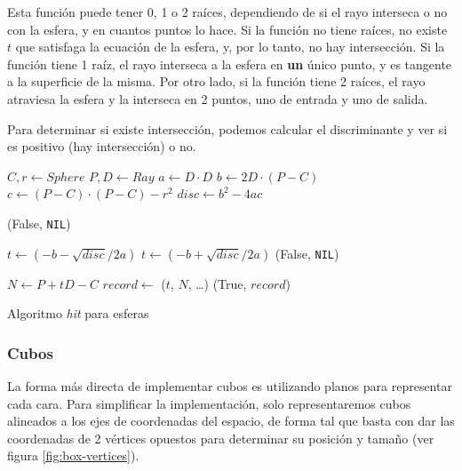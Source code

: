 Esta función puede tener 0, 1 o 2 raíces, dependiendo de si el rayo interseca o
no con la esfera, y en cuantos puntos lo hace. Si la función no tiene raíces, no
existe $t$ que satisfaga la ecuación de la esfera, y, por lo tanto, no hay
intersección. Si la función tiene 1 raíz, el rayo interseca a la esfera en
\textbf{un} único punto, y es tangente a la superficie de la misma. Por otro
lado, si la función tiene 2 raíces, el rayo atraviesa la esfera y la interseca
en 2 puntos, uno de entrada y uno de salida.

Para determinar si existe intersección, podemos calcular el discriminante y ver
si es positivo (hay intersección) o no.

\begin{algorithm}
  \begin{algorithmic}[1]
    \State $C, r \gets Sphere$ 
    \State $P, D \gets Ray$ 
    \State $a \gets D \cdot D$
    \State $b \gets 2D \cdot (P - C)$
    \State $c \gets (P - C) \cdot (P - C) - r^2$
    \State $disc \gets b^2 - 4ac$

    \State \Return (False, \texttt{NIL})
    \EndIf

    \State $t \gets (-b - \sqrt{disc} / 2a)$
    \State $t \gets (-b + \sqrt{disc} / 2a)$
    \State \Return (False, \texttt{NIL})
    \EndIf
    \EndIf

    \State $N \gets P + tD - C$ 
    \State $record \gets$ ($t$, $N$, \dots) 
    \State \Return (True, $record$)
    \EndFunction
  \end{algorithmic}
  \caption{Algoritmo \textit{hit} para esferas}
  \label{alg:sphere-hit}
\end{algorithm}

\subsubsection{Cubos}

La forma más directa de implementar cubos es utilizando planos para representar
cada cara. Para simplificar la implementación, solo representaremos cubos
alineados a los ejes de coordenadas del espacio, de forma tal que basta con dar
las coordenadas de 2 vértices opuestos para determinar su posición y tamaño (ver
figura \ref{fig:box-vertices}).

